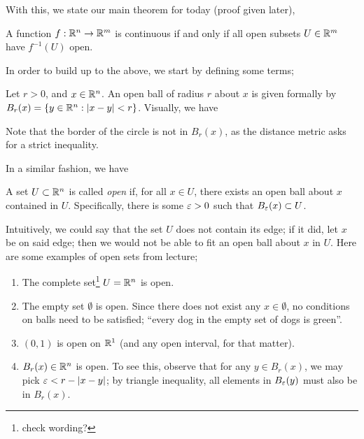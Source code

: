 \noindent With this, we state our main theorem for today (proof given later),

\begin{simplethm}
    A function $f : \mathbb R^n \to \mathbb R^m$ is continuous if and only if all open subsets $U \in \mathbb R^m$ have $f^{-1}(U)$ open.
\end{simplethm}

\noindent In order to build up to the above, we start by defining some terms;

\begin{definition}
    Let $r > 0$, and $x \in \mathbb R^n$. An open ball of radius $r$ about $x$ is given formally by $B_r(x) = \{y \in \mathbb R^n : \left\lvert x - y \right\rvert < r\}$. Visually, we have
    \begin{center}  \end{center}
    Note that the border of the circle is not in $B_r(x)$, as the distance metric asks for a strict inequality.
\end{definition}

\newpage
\noindent In a similar fashion, we have

\begin{definition}
    A set $U \subset \mathbb R^n$ is called \textit{open} if, for all $x \in U$, there exists an open ball about $x$ contained in $U$. Specifically, there is some $\varepsilon > 0$ such that $B_\varepsilon(x) \subset U$.
\end{definition}

\noindent Intuitively, we could say that the set $U$ does not contain its edge; if it did, let $x$ be on said edge; then we would not be able to fit an open ball about $x$ in $U$. Here are some examples of open sets from lecture;
\begin{enumerate}
    \item The complete set\footnote{check wording?} $U = \mathbb R^n$ is open.
    \item The empty set $\emptyset$ is open. Since there does not exist any $x \in \emptyset$, no conditions on balls need to be satisfied; ``every dog in the empty set of dogs is green''.
    \item $(0, 1)$ is open on $\mathbb R^1$ (and any open interval, for that matter).
    \item $B_r(x) \in \mathbb R^n$ is open. To see this, observe that for any $y \in B_r(x)$, we may pick $\varepsilon < r - \left\lvert x - y \right\rvert$; by triangle inequality, all elements in $B_\varepsilon(y)$ must also be in $B_r(x)$.
\end{enumerate}

